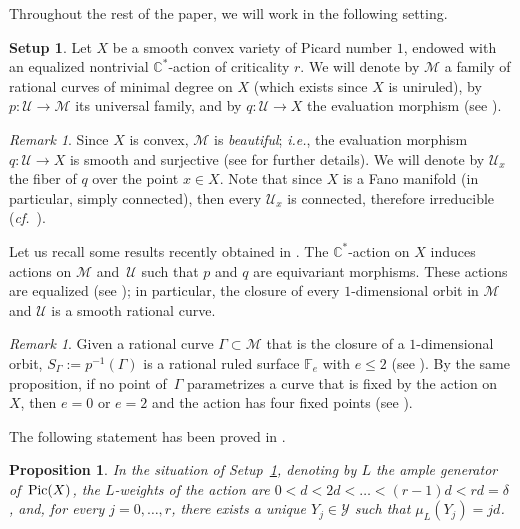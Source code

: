 \documentclass[10pt,a4paper]{article}
\numberwithin{equation}{section}
\newtheorem{proposition}[theorem]{Proposition}
\theoremstyle{definition}
\newtheorem{setup}[theorem]{Setup}
\theoremstyle{remark}
\newtheorem{remark}[theorem]{Remark}
\newcommand\FF{{\mathbb{F}}}
\def\C{{\mathbb C}}
\def\cM{{\mathcal M}}
\def\cU{{\mathcal U}}
\def\cY{{\mathcal Y}}
\def\operatorname#1{\mathop{\rm #1}\nolimits}
\def\Pic{\operatorname{Pic}}
\begin{document}
Throughout the rest of the paper, we will work in the following setting. 

\begin{setup}\label{set:main}
Let $X$ be a smooth convex variety of Picard number $1$, endowed with an equalized nontrivial $\C^*$-action of criticality $r$. 
We will denote by  $\cM$ a family of rational curves of minimal degree on $X$ (which exists since $X$ is uniruled), by $p\colon\cU \to \cM$ its universal family, and by $q\colon \cU \to X$ the evaluation morphism (see \cite[Proposition~II.2.11]{kollar}).
\end{setup}

\begin{remark}\label{rem:convexcurves}
Since $X$ is convex, $\cM$ is {\em beautiful}; \textit{i.e.}, the evaluation morphism $q\colon \cU \to X$ is smooth and surjective (see \cite[Section 2.7]{OS2} for further details). We will denote by $\cU_x$ the fiber of $q$ over the point $x \in X$. Note that since $X$ is a Fano manifold (in particular, simply connected), then  every $\cU_x$ is connected, therefore irreducible (\textit{cf.}~\cite[Proposition~1.6]{Kan5}). 
\end{remark}

Let us recall some results recently obtained in \cite{OS2}. 
The $\C^*$-action on $X$ induces actions on $\cM$ and~$\cU$ such that $p$ and $q$ are equivariant morphisms. These actions are equalized (see \cite[Propositions 4.5 and 4.8]{OS2}); in particular, the closure of every  $1$-dimensional orbit in $\cM$ and $\cU$ is a smooth rational curve.

\begin{remark}\label{rem:f2}
Given a rational curve $\Gamma \subset \cM$ that is the closure of a $1$-dimensional orbit, $S_\Gamma:=p^{-1}(\Gamma)$ is a rational ruled surface $\FF_e$ with $e \le 2$ (see \cite[Proposition 4.6]{OS2}). By the same proposition, if no point of~$\Gamma$ parametrizes a curve that is fixed by the action on $X$, then $e=0$ or $e=2$ and the action has four fixed points (see \cite[Figure 4.1]{OS2}).
\end{remark}
 
 The following statement has been proved in \cite[Theorem 5.3]{OS2}.
 
 \begin{proposition}\label{prop:onecomp}
 In the situation of Setup~\ref{set:main}, denoting by $L$ the ample generator of\, $\Pic(X)$, the $L$-weights of the action are $0 < d < 2d < \dots < (r-1)d < rd = \delta$, and, for every $j =0, \dots, r$, there exists a unique $Y_j \in \cY$ such that $\mu_L(Y_j)=jd$.
\end{proposition}
\end{document}
